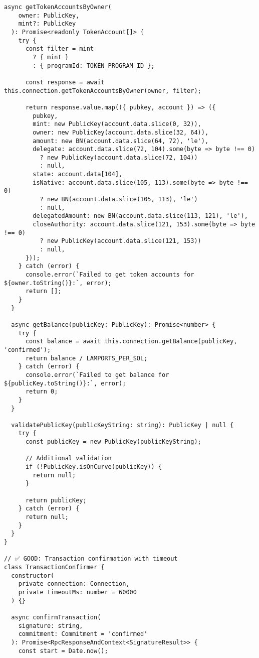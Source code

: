 \documentclass[11pt,a4paper]{article}
\begin{document}
\begin{lstlisting}[style=typescript, caption=Solana Web3.js Standards]
  async getTokenAccountsByOwner(
    owner: PublicKey,
    mint?: PublicKey
  ): Promise<readonly TokenAccount[]> {
    try {
      const filter = mint 
        ? { mint }
        : { programId: TOKEN_PROGRAM_ID };
      
      const response = await this.connection.getTokenAccountsByOwner(owner, filter);
      
      return response.value.map(({ pubkey, account }) => ({
        pubkey,
        mint: new PublicKey(account.data.slice(0, 32)),
        owner: new PublicKey(account.data.slice(32, 64)),
        amount: new BN(account.data.slice(64, 72), 'le'),
        delegate: account.data.slice(72, 104).some(byte => byte !== 0)
          ? new PublicKey(account.data.slice(72, 104))
          : null,
        state: account.data[104],
        isNative: account.data.slice(105, 113).some(byte => byte !== 0)
          ? new BN(account.data.slice(105, 113), 'le')
          : null,
        delegatedAmount: new BN(account.data.slice(113, 121), 'le'),
        closeAuthority: account.data.slice(121, 153).some(byte => byte !== 0)
          ? new PublicKey(account.data.slice(121, 153))
          : null,
      }));
    } catch (error) {
      console.error(`Failed to get token accounts for ${owner.toString()}:`, error);
      return [];
    }
  }
  
  async getBalance(publicKey: PublicKey): Promise<number> {
    try {
      const balance = await this.connection.getBalance(publicKey, 'confirmed');
      return balance / LAMPORTS_PER_SOL;
    } catch (error) {
      console.error(`Failed to get balance for ${publicKey.toString()}:`, error);
      return 0;
    }
  }
  
  validatePublicKey(publicKeyString: string): PublicKey | null {
    try {
      const publicKey = new PublicKey(publicKeyString);
      
      // Additional validation
      if (!PublicKey.isOnCurve(publicKey)) {
        return null;
      }
      
      return publicKey;
    } catch (error) {
      return null;
    }
  }
}

// ✅ GOOD: Transaction confirmation with timeout
class TransactionConfirmer {
  constructor(
    private connection: Connection,
    private timeoutMs: number = 60000
  ) {}
  
  async confirmTransaction(
    signature: string,
    commitment: Commitment = 'confirmed'
  ): Promise<RpcResponseAndContext<SignatureResult>> {
    const start = Date.now();
    

\end{lstlisting}
\end{document}
